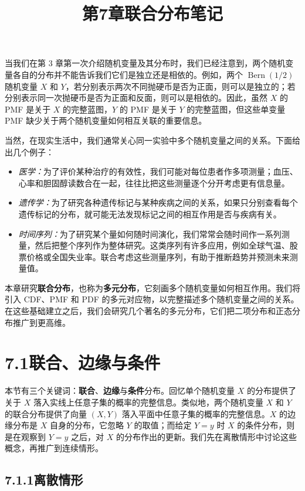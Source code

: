\documentclass[UTF8,12pt,a4paper,fontset=fandol]{ctexart}
\title{第7章\quad 联合分布笔记}
\author{}
\date{}
\begin{document}
\maketitle

当我们在第 3 章第一次介绍随机变量及其分布时，我们已经注意到，两个随机变量各自的分布并不能告诉我们它们是独立还是相依的。例如，两个 $\operatorname{Bern}(1/2)$ 随机变量 $X$ 和 $Y$，若分别表示两次不同抛硬币是否为正面，则可以是独立的；若分别表示同一次抛硬币是否为正面和反面，则可以是相依的。因此，虽然 $X$ 的 PMF 是关于 $X$ 的完整蓝图，$Y$ 的 PMF 是关于 $Y$ 的完整蓝图，但这些单变量 PMF 缺少关于两个随机变量如何相互关联的重要信息。

当然，在现实生活中，我们通常关心同一实验中多个随机变量之间的关系。下面给出几个例子：
\begin{itemize}
  \item \textit{医学：}为了评价某种治疗的有效性，我们可能对每位患者作多项测量；血压、心率和胆固醇读数合在一起，往往比把这些测量逐个分开考虑更有信息量。
  \item \textit{遗传学：}为了研究各种遗传标记与某种疾病之间的关系，如果只分别查看每个遗传标记的分布，就可能无法发现标记之间的相互作用是否与疾病有关。
  \item \textit{时间序列：}为了研究某个量如何随时间演化，我们常常会随时间作一系列测量，然后把整个序列作为整体研究。这类序列有许多应用，例如全球气温、股票价格或全国失业率。联合考虑这些测量序列，有助于推断趋势并预测未来测量值。
\end{itemize}

本章研究\textbf{联合分布}，也称为\textbf{多元分布}，它刻画多个随机变量如何相互作用。我们将引入 CDF、PMF 和 PDF 的多元对应物，以完整描述多个随机变量之间的关系。在这些基础建立之后，我们会研究几个著名的多元分布，它们把二项分布和正态分布推广到更高维。

\section*{7.1\quad 联合、边缘与条件}

本节有三个关键词：\textbf{联合}、\textbf{边缘}与\textbf{条件}分布。回忆单个随机变量 $X$ 的分布提供了关于 $X$ 落入实线上任意子集的概率的完整信息。类似地，两个随机变量 $X$ 和 $Y$ 的联合分布提供了向量 $(X,Y)$ 落入平面中任意子集的概率的完整信息。$X$ 的边缘分布是 $X$ 自身的分布，它忽略 $Y$ 的取值；而给定 $Y=y$ 时 $X$ 的条件分布，则是在观察到 $Y=y$ 之后，对 $X$ 的分布作出的更新。我们先在离散情形中讨论这些概念，再推广到连续情形。

\subsection*{7.1.1\quad 离散情形}
\end{document}
